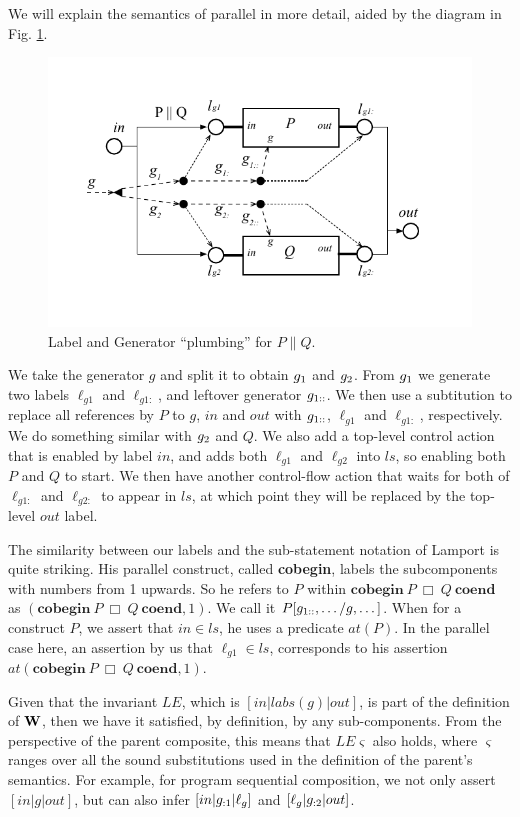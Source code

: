 We will explain the semantics of parallel in more detail,
aided by the diagram in Fig. \ref{fig:PAR-plumbing}.
\begin{figure}
  \includegraphics[scale=1.0]{images/PAR}
  \caption{Label and Generator ``plumbing'' for $P \parallel Q$.}
  \label{fig:PAR-plumbing}
\end{figure}
We take the generator $g$ and split it to obtain $g_{1}$ and $g_{2}$.
From $g_{1}$ we generate two labels $\ell_{g1}$ and $\ell_{g1:}$,
and leftover generator $g_{1::}$.
We then use a subtitution to replace all references
by $P$ to $g$, $in$ and $out$ with $g_{1::}$, $\ell_{g1}$ and $\ell_{g1:}$,
respectively. We do something similar with $g_{2}$ and $Q$.
We also add a top-level control action that is enabled by label $in$,
and adds both $\ell_{g1}$ and $\ell_{g2}$ into $ls$,
so enabling both $P$ and $Q$ to start.
We then have another control-flow action that waits for both of $\ell_{g1:}$
and $\ell_{g2:}$  to appear in $ls$,
at which point they will be replaced by the top-level $out$ label.

The similarity between our labels and the sub-statement notation
of Lamport is quite striking.
His parallel construct, called \textbf{cobegin}, labels the subcomponents with
numbers from 1 upwards. So he refers to $P$ within
$\mathbf{cobegin}~P~ \Box~ Q~ \mathbf{coend}$
as $(\mathbf{cobegin} ~P~ \Box ~Q~ \mathbf{coend},1)$.
We call it $P[g_{1::},\dots/g,\dots]$.
When for a construct $P$, we assert that $in \in ls$,
he uses a predicate $at(P)$.
In the parallel case here, an assertion by us that $\ell_{g1} \in ls$,
corresponds to his assertion $at(\mathbf{cobegin} ~P~ \Box ~Q~ \mathbf{coend},1)$.


Given that the invariant $LE$, which is $[in|labs(g)|out]$,
is part of the definition of $\mathbf{W}$,
then we have it satisfied, by definition, by any sub-components.
From the perspective of the parent composite, this means that $LE\varsigma$
also holds, where $\varsigma$ ranges over all the sound substitutions
used in the definition of the parent's semantics.
For example, for program sequential composition,
we not only assert $[in|g|out]$,
but can also infer $[in|g_{:1}|\ell_g]$
and $[\ell_g|g_{:2}|out]$.


